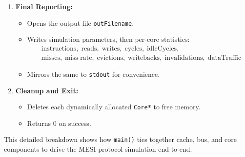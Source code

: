 \documentclass{article}
\begin{document}
\begin{itemize}
\begin{enumerate}
  \item \textbf{Final Reporting:}
    \begin{itemize}
      \item Opens the output file \texttt{outFilename}.
      \item Writes simulation parameters, then per‐core statistics:
        \[
          \begin{aligned}
            &\text{instructions},\;\text{reads},\;\text{writes},\;\text{cycles},\;\text{idleCycles},\\
            &\text{misses},\;\text{miss rate},\;\text{evictions},\;\text{writebacks},\;\text{invalidations},\;\text{dataTraffic}
          \end{aligned}
        \]
      \item Mirrors the same to \texttt{stdout} for convenience.
    \end{itemize}

  \item \textbf{Cleanup and Exit:}
    \begin{itemize}
      \item Deletes each dynamically allocated \texttt{Core*} to free memory.
      \item Returns 0 on success.
    \end{itemize}
\end{enumerate}

This detailed breakdown shows how \texttt{main()} ties together cache, bus, and core components to drive the MESI-protocol simulation end-to-end.

\end{itemize}
\end{document}

